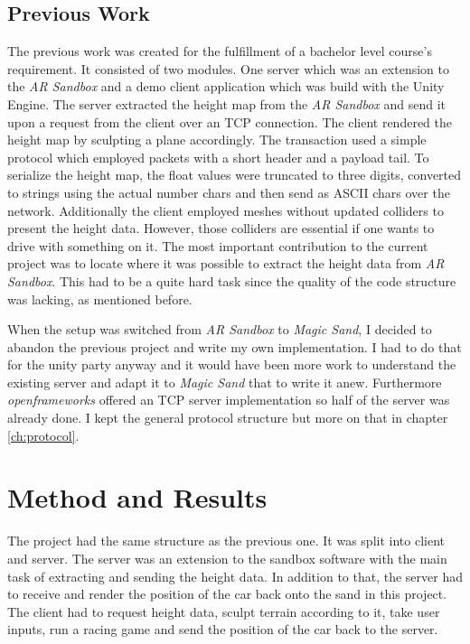 \documentclass[12pt,a4paper,twoside,titlepage,headsepline,numbers=noenddot,listof=totoc,index=totoc,bibliography=totoc]{scrartcl}
\theoremstyle{break}
\begin{document}
\subsection{Previous Work}
The previous work was created for the fulfillment of a bachelor level course's requirement. It consisted of two modules. One server which was an extension to the \textit{AR Sandbox} and a demo client application which was build with the Unity Engine. The server extracted the height map from the \textit{AR Sandbox} and send it upon a request from the client over an TCP connection. The client rendered the height map by sculpting a plane accordingly. The transaction used a simple protocol which employed packets with a short header and a payload tail. To serialize the height map, the float values were truncated to three digits, converted to strings using the actual number chars and then send as ASCII chars over the network.  Additionally the client employed meshes without updated colliders to present the height data. However, those colliders are essential if one wants to drive with something on it. The most important contribution to the current  project was to locate where it was possible to extract the height data from \textit{AR Sandbox}. This had to be a quite hard task since the quality of the code structure was lacking, as mentioned before. 

When the setup was switched from \textit{AR Sandbox} to \textit{Magic Sand}, I decided to abandon the previous project and write my own implementation. I had to do that for the unity party anyway and it would have been more work to understand the existing server and adapt it to \textit{Magic Sand} that to write it anew. Furthermore \textit{openframeworks} offered an TCP server implementation so half of the server was already done. I kept the general protocol structure but more on that in chapter \ref{ch:protocol}.


\section{Method and Results}
The project had the same structure as the previous one. It was split into client and server. The server was an extension to the sandbox software with the main task of extracting and sending the height data. In addition to that, the server had to receive and render the position of the car back onto the sand in this project. The client had to request height data, sculpt terrain according to it, take user inputs, run a racing game and send the position of the car back to the server.
\end{document}
